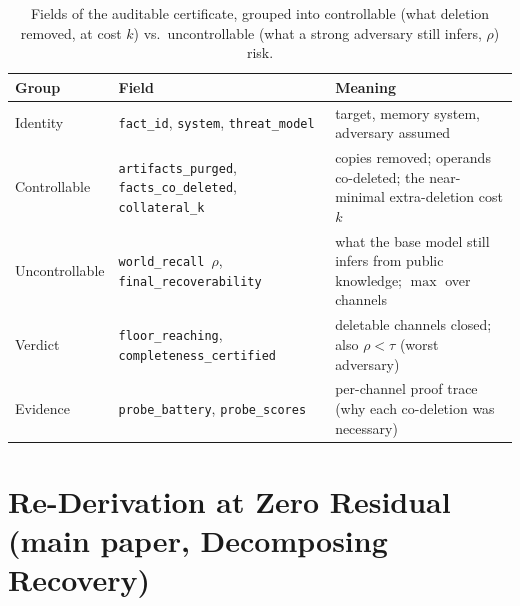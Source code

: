 \documentclass[11pt]{article}
\begin{document}
\begin{table}[h]\centering\small
\begin{tabular}{@{}p{20mm}p{30mm}p{58mm}@{}}
\toprule Group & Field & Meaning \\ \midrule
Identity & \texttt{fact\_id}, \texttt{system}, \texttt{threat\_model} & target, memory system, adversary assumed \\ \addlinespace
Controllable & \texttt{artifacts\_purged}, \texttt{facts\_co\_deleted}, \texttt{collateral\_k} & copies removed; operands co-deleted; the near-minimal extra-deletion cost $k$ \\ \addlinespace
Uncontrollable & \texttt{world\_recall}~$\rho$, \texttt{final\_recoverability} & what the base model still infers from public knowledge; $\max$ over channels \\ \addlinespace
Verdict & \texttt{floor\_reaching}, \texttt{completeness\_certified} & deletable channels closed; also $\rho<\tau$ (worst adversary) \\ \addlinespace
Evidence & \texttt{probe\_battery}, \texttt{probe\_scores} & per-channel proof trace (why each co-deletion was necessary) \\ \bottomrule
\end{tabular}
\caption{Fields of the auditable certificate, grouped into controllable (what deletion
removed, at cost $k$) vs.\ uncontrollable (what a strong adversary still infers, $\rho$) risk.}
\end{table}

\section{Re-Derivation at Zero Residual (main paper, Decomposing Recovery)}
\end{document}
